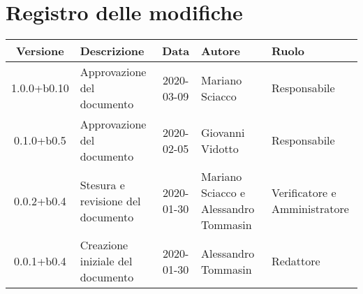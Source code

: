 \section*{Registro delle modifiche}

\begin{center}
	\begin{longtable}{|c|p{3.5cm}|c|p{3cm}|p{3cm}|}
	\hline
	\rowcolor{lighter-grayer}
	\textbf{Versione} & \textbf{Descrizione} & \textbf{Data} & \textbf{Autore} & \textbf{Ruolo} \\
	\hline
	\endfirsthead


	1.0.0+b0.10 & Approvazione del documento & 2020-03-09 & Mariano Sciacco & Responsabile \\
	\hline
	0.1.0+b0.5 & Approvazione del documento & 2020-02-05 & Giovanni Vidotto & Responsabile \\
	\hline
	0.0.2+b0.4 & Stesura e revisione del documento & 2020-01-30 & Mariano Sciacco e Alessandro Tommasin & Verificatore e Amministratore \\
	\hline
	0.0.1+b0.4 & Creazione iniziale del documento & 2020-01-30 & Alessandro Tommasin & Redattore \\
	\hline

	\end{longtable}
\end{center}